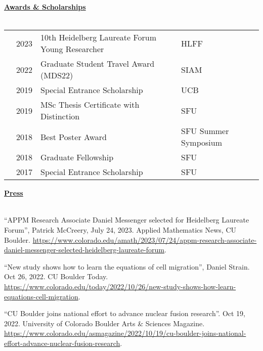 \documentclass[letterpaper,11pt,oneside]{article}
\newcommand{\headr}[1]{\vspace{10pt}\uline{\Large{\textbf{#1}} \hfill } \\ \vspace{-10pt}\\}
\begin{document}



\headr{Awards \& Scholarships}

\begin{tabular}{@{} p{0.01cm} p{2cm} p{9cm} p{8cm}}
& 2023 & 10th Heidelberg Laureate Forum Young Researcher & HLFF \\
& 2022 & Graduate Student Travel Award (MDS22) & SIAM \\
& 2019 & Special Entrance Scholarship & UCB \\
& 2019 & MSc Thesis Certificate with Distinction & SFU \\
& 2018 & Best Poster Award & SFU Summer Symposium \\
& 2018 & Graduate Fellowship & SFU \\
& 2017 & Special Entrance Scholarship & SFU \\
\end{tabular}

\headr{Press}
\vspace{-0.5cm}
\begin{sloppypar}
\begin{enumerate}[label={[\arabic*]}]
\item 
\raggedright``APPM Research Associate Daniel Messenger selected for Heidelberg Laureate Forum'', Patrick McCreery, July 24, 2023. Applied Mathematics News, CU Boulder. \url{https://www.colorado.edu/amath/2023/07/24/appm-research-associate-daniel-messenger-selected-heidelberg-laureate-forum}.
\item \raggedright``New study shows how to learn the equations of cell migration'', Daniel Strain. Oct 26, 2022. CU Boulder Today. \url{https://www.colorado.edu/today/2022/10/26/new-study-shows-how-learn-equations-cell-migration}.
\item 
\raggedright``CU Boulder joins national effort to advance nuclear fusion research''. Oct 19, 2022. University of Colorado Boulder Arts \& Sciences Magazine. \url{https://www.colorado.edu/asmagazine/2022/10/19/cu-boulder-joins-national-effort-advance-nuclear-fusion-research}.
\end{enumerate}
\end{sloppypar}
\end{document}
